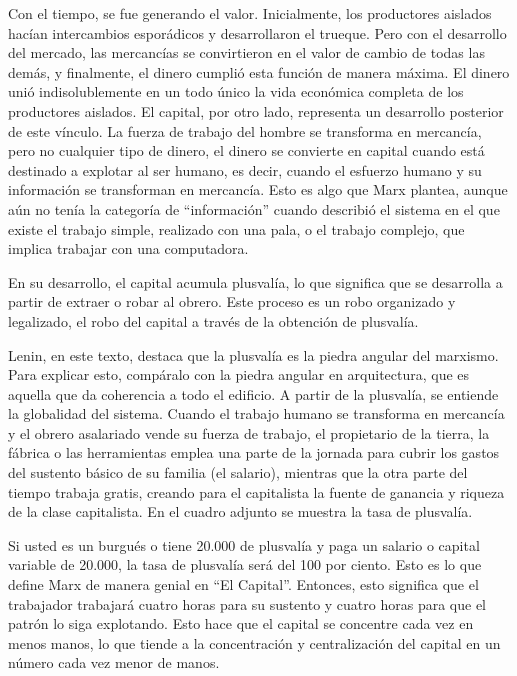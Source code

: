 \documentclass[
  a4paper,
]{article}
\begin{document}
Con el tiempo, se fue generando el valor. Inicialmente, los productores
aislados hacían intercambios esporádicos y desarrollaron el trueque.
Pero con el desarrollo del mercado, las mercancías se convirtieron en el
valor de cambio de todas las demás, y finalmente, el dinero cumplió esta
función de manera máxima. El dinero unió indisolublemente en un todo
único la vida económica completa de los productores aislados. El
capital, por otro lado, representa un desarrollo posterior de este
vínculo. La fuerza de trabajo del hombre se transforma en mercancía,
pero no cualquier tipo de dinero, el dinero se convierte en capital
cuando está destinado a explotar al ser humano, es decir, cuando el
esfuerzo humano y su información se transforman en mercancía. Esto es
algo que Marx plantea, aunque aún no tenía la categoría de
``información'' cuando describió el sistema en el que existe el trabajo
simple, realizado con una pala, o el trabajo complejo, que implica
trabajar con una computadora.

En su desarrollo, el capital acumula plusvalía, lo que significa que se
desarrolla a partir de extraer o robar al obrero. Este proceso es un
robo organizado y legalizado, el robo del capital a través de la
obtención de plusvalía.

Lenin, en este texto, destaca que la plusvalía es la piedra angular del
marxismo. Para explicar esto, compáralo con la piedra angular en
arquitectura, que es aquella que da coherencia a todo el edificio. A
partir de la plusvalía, se entiende la globalidad del sistema. Cuando el
trabajo humano se transforma en mercancía y el obrero asalariado vende
su fuerza de trabajo, el propietario de la tierra, la fábrica o las
herramientas emplea una parte de la jornada para cubrir los gastos del
sustento básico de su familia (el salario), mientras que la otra parte
del tiempo trabaja gratis, creando para el capitalista la fuente de
ganancia y riqueza de la clase capitalista. En el cuadro adjunto se
muestra la tasa de plusvalía.

Si usted es un burgués o tiene 20.000 de plusvalía y paga un salario o
capital variable de 20.000, la tasa de plusvalía será del 100 por
ciento. Esto es lo que define Marx de manera genial en ``El Capital''.
Entonces, esto significa que el trabajador trabajará cuatro horas para
su sustento y cuatro horas para que el patrón lo siga explotando. Esto
hace que el capital se concentre cada vez en menos manos, lo que tiende
a la concentración y centralización del capital en un número cada vez
menor de manos.
\end{document}

